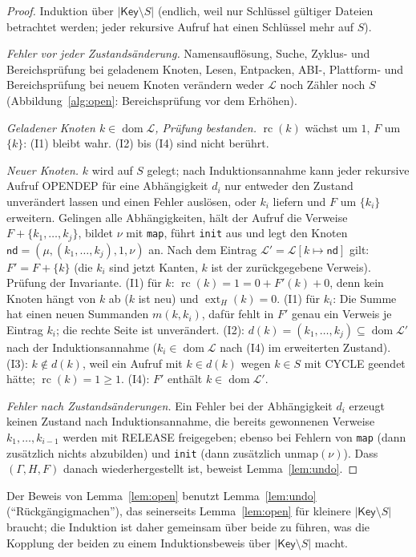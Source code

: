 \documentclass[a4paper,12pt,twoside]{report}
\DeclareRobustCommand{\_}{\ifmmode\mbox{\textunderscore}\else\textunderscore\allowbreak{}\fi}
\theoremstyle{definition}
\newcommand{\dom}{\operatorname{dom}}
\newcommand{\ext}{\operatorname{ext}}
\newcommand{\rc}{\operatorname{rc}}
\begin{document}
\begin{proof}
	Induktion über $|\mathsf{Key}\setminus S|$ (endlich, weil nur Schlüssel gültiger Dateien betrachtet werden; jeder rekursive Aufruf hat einen Schlüssel mehr auf $S$).

	\emph{Fehler vor jeder Zustandsänderung.} Namensauflösung, Suche, Zyklus- und Bereichsprüfung bei geladenem Knoten, Lesen, Entpacken, ABI-, Plattform- und Bereichsprüfung bei neuem Knoten verändern weder $\mathcal L$ noch Zähler noch $S$ (Abbildung~\ref{alg:open}: Bereichsprüfung vor dem Erhöhen).

	\emph{Geladener Knoten $k\in\dom\mathcal L$, Prüfung bestanden.} $\rc(k)$ wächst um $1$, $F$ um $\{k\}$: (I1) bleibt wahr. (I2) bis (I4) sind nicht berührt.

	\emph{Neuer Knoten.} $k$ wird auf $S$ gelegt; nach Induktionsannahme kann jeder rekursive Aufruf OPEN\_DEP für eine Abhängigkeit $d_i$ nur entweder den Zustand unverändert lassen und einen Fehler auslösen, oder $k_i$ liefern und $F$ um $\{k_i\}$ erweitern. Gelingen alle Abhängigkeiten, hält der Aufruf die Verweise $F+\{k_1,\ldots,k_j\}$, bildet $\nu$ mit \texttt{map}, führt \texttt{init} aus und legt den Knoten $\mathsf{nd}=(\mu,(k_1,\ldots,k_j),1,\nu)$ an. Nach dem Eintrag $\mathcal L'=\mathcal L[k\mapsto\mathsf{nd}]$ gilt: $F'=F+\{k\}$ (die $k_i$ sind jetzt Kanten, $k$ ist der zurückgegebene Verweis). Prüfung der Invariante. (I1) für $k$: $\rc(k)=1=0+F'(k)+0$, denn kein Knoten hängt von $k$ ab ($k$ ist neu) und $\ext_H(k)=0$. (I1) für $k_i$: Die Summe hat einen neuen Summanden $m(k,k_i)$, dafür fehlt in $F'$ genau ein Verweis je Eintrag $k_i$; die rechte Seite ist unverändert. (I2): $d(k)=(k_1,\ldots,k_j)\subseteq\dom\mathcal L'$ nach der Induktionsannahme ($k_i\in\dom\mathcal L$ nach (I4) im erweiterten Zustand). (I3): $k\notin d(k)$, weil ein Aufruf mit $k\in d(k)$ wegen $k\in S$ mit CYCLE geendet hätte; $\rc(k)=1\ge1$. (I4): $F'$ enthält $k\in\dom\mathcal L'$.

	\emph{Fehler nach Zustandsänderungen.} Ein Fehler bei der Abhängigkeit $d_{i}$ erzeugt keinen Zustand nach Induktionsannahme, die bereits gewonnenen Verweise $k_1,\ldots,k_{i-1}$ werden mit RELEASE freigegeben; ebenso bei Fehlern von \texttt{map} (dann zusätzlich nichts abzubilden) und \texttt{init} (dann zusätzlich $\mathrm{unmap}(\nu)$). Dass $(\Gamma,H,F)$ danach wiederhergestellt ist, beweist Lemma~\ref{lem:undo}.
\end{proof}

Der Beweis von Lemma~\ref{lem:open} benutzt Lemma~\ref{lem:undo} (``Rückgängigmachen''), das seinerseits Lemma~\ref{lem:open} für kleinere $|\mathsf{Key}\setminus S|$ braucht; die Induktion ist daher gemeinsam über beide zu führen, was die Kopplung der beiden zu einem Induktionsbeweis über $|\mathsf{Key}\setminus S|$ macht.
\end{document}
